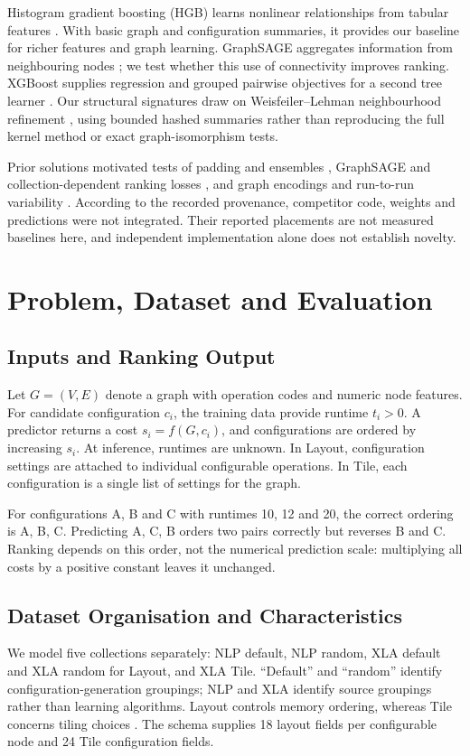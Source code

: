 \documentclass[letterpaper]{article}
\begin{document}
Histogram gradient boosting (HGB) learns nonlinear relationships from tabular features \citep{sklearn,hgbdocs}. With basic graph and configuration summaries, it provides our baseline for richer features and graph learning. GraphSAGE aggregates information from neighbouring nodes \citep{graphsage}; we test whether this use of connectivity improves ranking. XGBoost supplies regression and grouped pairwise objectives for a second tree learner \citep{xgboost,xgbrank}. Our structural signatures draw on Weisfeiler--Lehman neighbourhood refinement \citep{wl}, using bounded hashed summaries rather than reproducing the full kernel method or exact graph-isomorphism tests.

Prior solutions motivated tests of padding and ensembles \citep{vietbr}, GraphSAGE and collection-dependent ranking losses \citep{latenciaga}, and graph encodings and run-to-run variability \citep{duck}. According to the recorded provenance, competitor code, weights and predictions were not integrated. Their reported placements are not measured baselines here, and independent implementation alone does not establish novelty.

\section{Problem, Dataset and Evaluation}
\subsection{Inputs and Ranking Output}
Let $G=(V,E)$ denote a graph with operation codes and numeric node features. For candidate configuration $c_i$, the training data provide runtime $t_i>0$. A predictor returns a cost $s_i=f(G,c_i)$, and configurations are ordered by increasing $s_i$. At inference, runtimes are unknown. In Layout, configuration settings are attached to individual configurable operations. In Tile, each configuration is a single list of settings for the graph.

For configurations A, B and C with runtimes 10, 12 and 20, the correct ordering is A, B, C. Predicting A, C, B orders two pairs correctly but reverses B and C. Ranking depends on this order, not the numerical prediction scale: multiplying all costs by a positive constant leaves it unchanged.

\subsection{Dataset Organisation and Characteristics}
We model five collections separately: NLP default, NLP random, XLA default and XLA random for Layout, and XLA Tile. ``Default'' and ``random'' identify configuration-generation groupings; NLP and XLA identify source groupings rather than learning algorithms. Layout controls memory ordering, whereas Tile concerns tiling choices \citep{tpudata}. The schema supplies 18 layout fields per configurable node and 24 Tile configuration fields.
\end{document}
